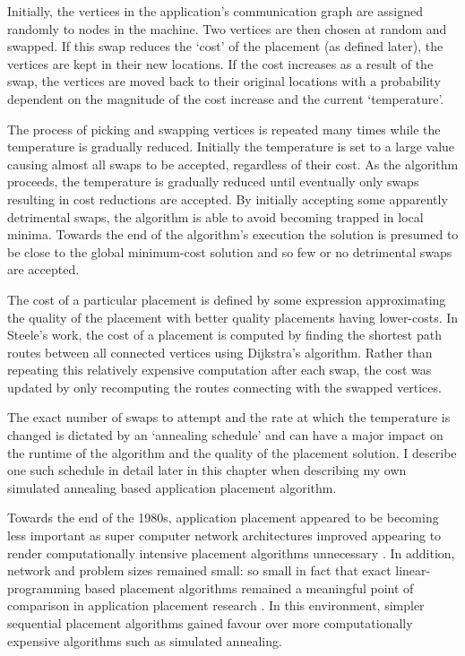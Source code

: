 				Initially, the vertices in the application's communication graph are
				assigned randomly to nodes in the machine. Two vertices are then chosen
				at random and swapped.  If this swap reduces the `cost' of the
				placement (as defined later), the vertices are kept in their new
				locations. If the cost increases as a result of the swap, the vertices
				are moved back to their original locations with a probability dependent
				on the magnitude of the cost increase and the current `temperature'.
				
				The process of picking and swapping vertices is repeated many times
				while the temperature is gradually reduced. Initially the temperature
				is set to a large value causing almost all swaps to be accepted,
				regardless of their cost. As the algorithm proceeds, the temperature is
				gradually reduced until eventually only swaps resulting in cost
				reductions are accepted. By initially accepting some apparently
				detrimental swaps, the algorithm is able to avoid becoming trapped in
				local minima. Towards the end of the algorithm's execution the solution
				is presumed to be close to the global minimum-cost solution and so few
				or no detrimental swaps are accepted.
				
				The cost of a particular placement is defined by some expression
				approximating the quality of the placement with better quality
				placements having lower-costs. In Steele's work, the cost of a
				placement is computed by finding the shortest path routes between all
				connected vertices using Dijkstra's algorithm. Rather than repeating
				this relatively expensive computation after each swap, the cost was
				updated by only recomputing the routes connecting with the swapped
				vertices.
				
				The exact number of swaps to attempt and the rate at which the
				temperature is changed is dictated by an `annealing schedule' and can
				have a major impact on the runtime of the algorithm and the quality of
				the placement solution. I describe one such schedule in detail later in
				this chapter when describing my own simulated annealing based
				application placement algorithm.
				
				Towards the end of the 1980s, application placement appeared to be
				becoming less important as super computer network architectures
				improved appearing to render computationally intensive placement
				algorithms unnecessary \cite{dally87}.  In addition, network and
				problem sizes remained small: so small in fact that exact
				linear-programming based placement algorithms remained a meaningful
				point of comparison in application placement research \cite{xu91}. In
				this environment, simpler sequential placement algorithms gained favour
				over more computationally expensive algorithms such as simulated
				annealing.
				
